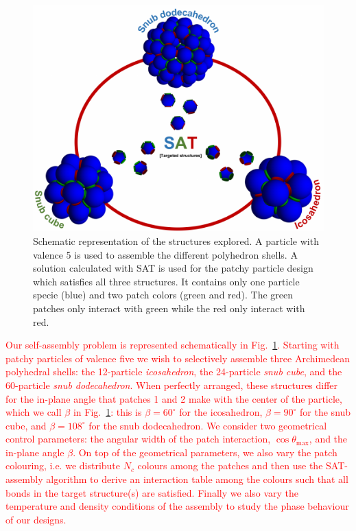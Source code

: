 \documentclass[a4paper, amsfonts, amssymb, amsmath, reprint, showkeys, nofootinbib, twoside]{revtex4-1}
\begin{document}
\begin{figure}[t]
	\includegraphics{fig1.pdf}
	\caption{\label{SAT} Schematic representation of the structures explored. A particle with valence 5 is used to assemble the different polyhedron shells. A solution calculated with SAT is used for the patchy particle design which satisfies all three structures. It contains only one particle specie (blue) and two patch colors (green and red). The green patches only interact with green while the red only interact with red.}
\end{figure}


\textcolor{red}{Our self-assembly problem is represented schematically in Fig.~\ref{SAT}. Starting with patchy particles of valence five we wish to selectively assemble three Archimedean polyhedral shells: the 12-particle \emph{icosahedron}, the 24-particle \emph{snub cube}, and the 60-particle \emph{snub dodecahedron}. When perfectly arranged, these structures differ for the in-plane angle that patches 1 and 2 make with the center of the particle, which we call $\beta$ in Fig.~\ref{SAT}: this is $\beta=60^\circ$ for the icosahedron, $\beta=90^\circ$ for the snub cube, and  $\beta=108^\circ$ for the snub dodecahedron. We consider two geometrical control parameters: the angular width of the patch interaction, $\cos\theta_\text{max}$, and the in-plane angle $\beta$. On top of the geometrical parameters, we also vary the patch colouring, i.e. we distribute $N_c$ colours among the patches and then use the SAT-assembly algorithm to derive an interaction table among the colours such that all bonds in the target structure(s) are satisfied. Finally we also vary the temperature and density conditions of the assembly to study the phase behaviour of our designs.}
\end{document}

